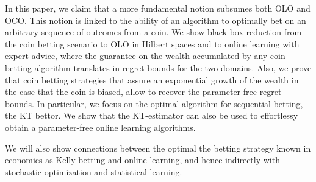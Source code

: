 In this paper, we claim that a more fundamental notion subsumes both \ac{OLO} and \ac{OCO}. This notion is linked to the ability of an algorithm to optimally bet on an arbitrary sequence of outcomes from a coin.
We show black box reduction from the coin betting scenario to \ac{OLO} in Hilbert spaces and to online learning with expert advice, where the guarantee on the wealth accumulated by any coin betting algorithm translates in regret bounds for the two domains.
Also, we prove that coin betting strategies that assure an exponential growth of the wealth in the case that the coin is biased, allow to recover the parameter-free regret bounds.
In particular, we focus on the optimal algorithm for sequential betting, the \ac{KT} bettor.
We show that the \ac{KT}-estimator can also be used to effortlessy obtain a parameter-free online learning algorithms.

We will also show connections between the optimal the betting strategy known in economics as Kelly betting \citep{Kelly56} and online learning, and hence indirectly with stochastic optimization and statistical learning.